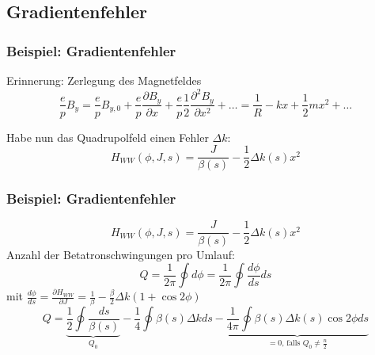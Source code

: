 \documentclass[hyperref={pdfpagelabels=false}]{beamer}
\begin{document}
\subsection{Gradientenfehler}
\begin{frame}
\frametitle{Beispiel: Gradientenfehler}

Erinnerung: Zerlegung des Magnetfeldes
\begin{equation*}
\frac{e}{p}B_y = \frac{e}{p}B_{y,0} + \frac{e}{p}\frac{\partial B_y}{\partial x} + \frac{e}{p}\frac{1}{2}\frac{\partial^2 B_y}{\partial x^2} + \dots = \frac{1}{R} - kx + \frac{1}{2} mx^2 + \dots
\end{equation*}
\pause

\vspace*{.6cm}
Habe nun das Quadrupolfeld einen Fehler $\Delta k$:
\begin{equation*}
H_{WW}(\phi,J,s) = \frac{J}{\beta(s)} - \frac{1}{2}\Delta k(s) x^2
\end{equation*}

\end{frame}
\begin{frame}
\frametitle{Beispiel: Gradientenfehler}
\begin{equation*}
H_{WW}(\phi,J,s) = \frac{J}{\beta(s)} - \frac{1}{2}\Delta k(s) x^2
\end{equation*}
Anzahl der Betatronschwingungen pro Umlauf:
\begin{equation*}
Q = \frac{1}{2\pi}\oint d\phi = \frac{1}{2\pi} \oint \frac{d\phi}{ds} ds
\end{equation*}
mit $\frac{d\phi}{ds} = \frac{\partial H_{WW}}{\partial J} = \frac{1}{\beta} - \frac{\beta}{2}\Delta k (1+\cos 2\phi)$
\pause
\begin{equation*}
Q = \underbrace{\frac{1}{2}\oint \frac{ds}{\beta(s)}}_{Q_0} - \frac{1}{4}\oint \beta(s) \Delta k ds - \underbrace{\frac{1}{4\pi}\oint\beta(s) \Delta k(s) \cos 2\phi ds}_{ = 0\text{, falls } Q_0 \neq \frac{n}{2}}
\end{equation*}
\end{frame}
\end{document}

